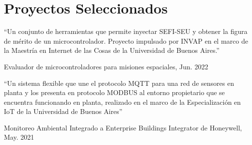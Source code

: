 \section{Proyectos Seleccionados}

\newcommand{\pub}[5]{
	\parbox[t][][t]{\linewidth}{%
		\begin{small}
		\parbox{\linewidth}{{``#4''}}
		\smallbreak
		\parbox{\linewidth}{{#2}, {#1}}
		\parbox{\linewidth}{{\href{https://doi.org/#3}{#3}}}
		\end{small}
	}
	\bigbreak
	\smallskip
}

\pub{Jun. 2022}{Evaluador de microcontroladores para misiones espaciales}{}{Un conjunto de herramientas que permite inyectar SEFI-SEU y obtener la figura de mérito de un microcontrolador. Proyecto impulsado por INVAP en el marco de la Maestría en Internet de las Cosas de la Universidad de Buenos Aires.}{
}

\pub{May. 2021}{Monitoreo Ambiental Integrado a Enterprise Buildings Integrator de Honeywell}{}{Un sistema flexible que une el protocolo MQTT para una red de sensores en planta y los presenta en protocolo MODBUS al entorno propietario que se encuentra funcionando en planta, realizado en el marco de la Especialización en IoT de la Universidad de Buenos Aires}{
}


